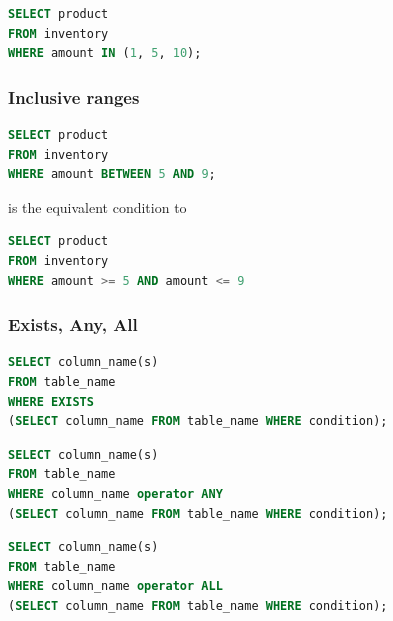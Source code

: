 \documentclass{article}
\begin{document}
\vspace{8pt} \begin{lstlisting}[language=SQL]
SELECT product
FROM inventory
WHERE amount IN (1, 5, 10);
\end{lstlisting} \vspace{8pt}

\subsubsection{Inclusive ranges}

\vspace{8pt} \begin{lstlisting}[language=SQL]
SELECT product
FROM inventory
WHERE amount BETWEEN 5 AND 9;
\end{lstlisting} \vspace{8pt}

is the equivalent condition to

\vspace{8pt} \begin{lstlisting}[language=SQL]
SELECT product
FROM inventory
WHERE amount >= 5 AND amount <= 9
\end{lstlisting} \vspace{8pt}

\subsubsection{Exists, Any, All}

\vspace{8pt} \begin{lstlisting}[language=SQL]
SELECT column_name(s)
FROM table_name
WHERE EXISTS
(SELECT column_name FROM table_name WHERE condition);
\end{lstlisting} \vspace{8pt}

\vspace{8pt} \begin{lstlisting}[language=SQL]
SELECT column_name(s)
FROM table_name
WHERE column_name operator ANY
(SELECT column_name FROM table_name WHERE condition);
\end{lstlisting} \vspace{8pt}

\vspace{8pt} \begin{lstlisting}[language=SQL]
SELECT column_name(s)
FROM table_name
WHERE column_name operator ALL
(SELECT column_name FROM table_name WHERE condition);
\end{lstlisting} \vspace{8pt}
\end{document}
